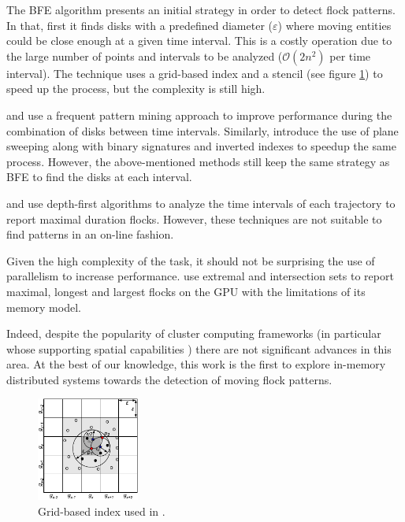 \documentclass[12pt]{scrartcl}
\begin{document}
The BFE algorithm presents an initial strategy in order to detect flock patterns.  In that, first it finds disks with a predefined diameter ($\varepsilon$) where moving entities could be close enough at a given time interval.  This is a costly operation due to the large number of points and intervals to be analyzed ($\mathcal{O}(2n^2)$ per time interval).  The technique uses a grid-based index and a stencil (see figure \ref{fig:grid}) to speed up the process, but the complexity is still high.

\cite{calderon_romero_mining_2011} and \cite{turdukulov_visual_2014} use a frequent pattern mining approach to improve performance during the combination of disks between time intervals.  Similarly, \cite{tanaka_improved_2016} introduce the use of plane sweeping along with binary signatures and inverted indexes to speedup the same process.  However, the above-mentioned methods still keep the same strategy as BFE to find the disks at each interval.  

\cite{arimura_finding_2014} and \cite{geng_enumeration_2014} use depth-first algorithms to analyze the time intervals of each trajectory to report maximal duration flocks.  However, these techniques are not suitable to find patterns in an on-line fashion.

Given the high complexity of the task, it should not be surprising the use of parallelism to increase performance.  \cite{fort_parallel_2014} use extremal and intersection sets to report maximal, longest and largest flocks on the GPU with the limitations of its memory model.  

Indeed, despite the popularity of cluster computing frameworks (in particular whose supporting spatial capabilities \cite{eldawy_spatialhadoop:_2014, yu_demonstration_2016, pellechia_geomesa:_2015-1, xie_simba:_2016-1}) there are not significant advances in this area.  At the best of our knowledge, this work is the first to explore in-memory distributed systems towards the detection of moving flock patterns.

\begin{figure}
 \centering
 \includegraphics[width=0.3\textwidth]{./figures/grid}
 \caption{Grid-based index used in \cite{vieira_-line_2009}.}
 \label{fig:grid}
\end{figure}
\end{document}
